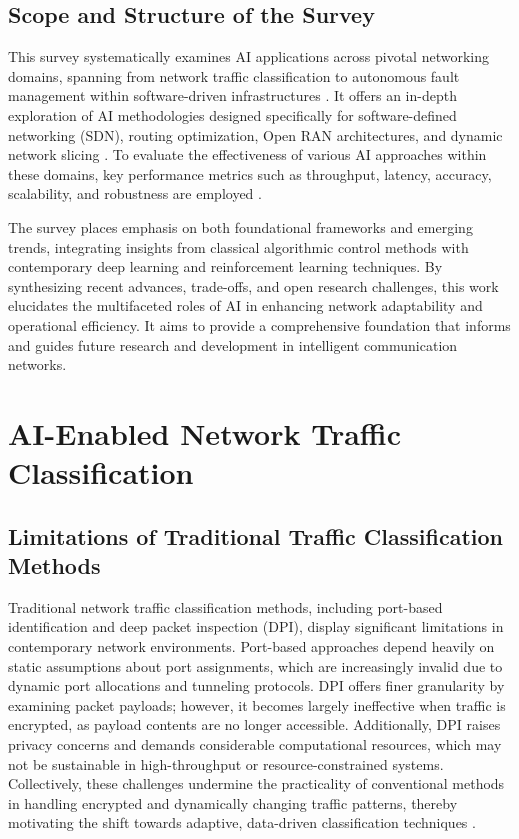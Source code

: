\documentclass[sigconf]{acmart}
\begin{document}
\subsection{Scope and Structure of the Survey}

This survey systematically examines AI applications across pivotal networking domains, spanning from network traffic classification to autonomous fault management within software-driven infrastructures \cite{ref31,ref32}. It offers an in-depth exploration of AI methodologies designed specifically for software-defined networking (SDN), routing optimization, Open RAN architectures, and dynamic network slicing \cite{ref33,ref34,ref35}. To evaluate the effectiveness of various AI approaches within these domains, key performance metrics such as throughput, latency, accuracy, scalability, and robustness are employed \cite{ref51,ref52}. 

The survey places emphasis on both foundational frameworks and emerging trends, integrating insights from classical algorithmic control methods with contemporary deep learning and reinforcement learning techniques. By synthesizing recent advances, trade-offs, and open research challenges, this work elucidates the multifaceted roles of AI in enhancing network adaptability and operational efficiency. It aims to provide a comprehensive foundation that informs and guides future research and development in intelligent communication networks.

\section{AI-Enabled Network Traffic Classification}

\subsection{Limitations of Traditional Traffic Classification Methods}

Traditional network traffic classification methods, including port-based identification and deep packet inspection (DPI), display significant limitations in contemporary network environments. Port-based approaches depend heavily on static assumptions about port assignments, which are increasingly invalid due to dynamic port allocations and tunneling protocols. DPI offers finer granularity by examining packet payloads; however, it becomes largely ineffective when traffic is encrypted, as payload contents are no longer accessible. Additionally, DPI raises privacy concerns and demands considerable computational resources, which may not be sustainable in high-throughput or resource-constrained systems. Collectively, these challenges undermine the practicality of conventional methods in handling encrypted and dynamically changing traffic patterns, thereby motivating the shift towards adaptive, data-driven classification techniques \cite{ref51}.
\end{document}
